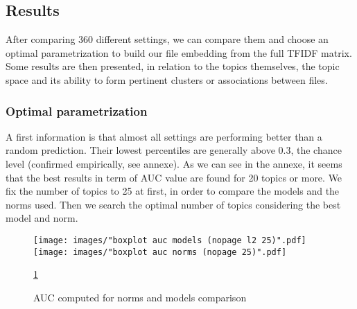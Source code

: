 \documentclass[a4paper]{article}
\begin{document}
	\subsection{Results}	
	
	After comparing 360 different settings, we can compare them and choose an optimal parametrization to build our file embedding from the full \ac{TFIDF} matrix. Some results are then presented, in relation to the topics themselves, the topic space and its ability to form pertinent clusters or associations between files.
	
	\subsubsection{Optimal parametrization}
	
	
	
	A first information is that almost all settings are performing better than a random prediction. Their lowest percentiles are generally above 0.3, the chance level (confirmed empirically, see annexe). As we can see in the annexe, it seems that the best results in term of \ac{AUC} value are found for 20 topics or more. We fix the number of topics to 25 at first, in order to compare the models and the norms used. Then we search the optimal number of topics considering the best model and norm.\\
	
	\begin{figure}[]
		\texttt{[image: images/"boxplot auc models (nopage l2 25)".pdf]}
		\label{fig:gridsearch-models}
		\endminipage\hfill
		\texttt{[image: images/"boxplot auc norms (nopage 25)".pdf]}
		\label{fig:gridsearch-norms}
		\endminipage
		\caption{AUC computed for norms and models comparison}
		\label{fig:gridsearch}
		\ref{fig:gridsearch}
	\end{figure}
\end{document}
